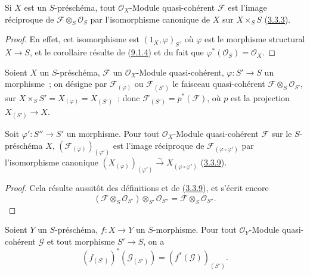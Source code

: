 \begin{corollary}[9.1.7]
\label{I.9.1.7-fr}
Si $X$ est un $S$-préschéma, tout $\mathscr{O}_X$-Module quasi-cohérent
$\mathscr{F}$ est l'image réciproque de
$\mathscr{F}\otimes_S\mathscr{O}_S$ par l'isomorphisme canonique de $X$ sur
$X\times_S S$ \textup{(\hyperref[I.3.3.3-fr]{3.3.3})}.
\end{corollary}

\begin{proof}
En effet, cet isomorphisme est $(1_X,\varphi)_S$, où $\varphi$ est le
morphisme structural $X\to S$, et le corollaire résulte de
(\hyperref[I.9.1.4-fr]{9.1.4}) et du fait que
$\varphi^*(\mathscr{O}_S)=\mathscr{O}_X$.
\end{proof}

\begin{env}[9.1.8]
\label{I.9.1.8-fr}
Soient $X$ un $S$-préschéma, $\mathscr{F}$ un $\mathscr{O}_X$-Module
quasi-cohérent, $\varphi:S'\to S$ un morphisme~; on désigne par
$\mathscr{F}_{(\varphi)}$ ou $\mathscr{F}_{(S')}$ le faisceau
quasi-cohérent $\mathscr{F}\otimes_S\mathscr{O}_{S'}$, sur
$X\times_S S'=X_{(\varphi)}=X_{(S')}$~; donc
$\mathscr{F}_{(S')}=p^*(\mathscr{F})$, où $p$ est la projection
$X_{(S')}\to X$.
\end{env}

\begin{proposition}[9.1.9]
\label{I.9.1.9-fr}
Soit $\varphi':S''\to S'$ un morphisme. Pour tout
$\mathscr{O}_X$-Module quasi-cohérent $\mathscr{F}$ sur le $S$-préschéma
$X$, $(\mathscr{F}_{(\varphi)})_{(\varphi')}$ est l'image réciproque de
$\mathscr{F}_{(\varphi\circ\varphi')}$ par l'isomorphisme canonique
$(X_{(\varphi)})_{(\varphi')}\xrightarrow{\sim}
X_{(\varphi\circ\varphi')}$ \textup{(\hyperref[I.3.3.9-fr]{3.3.9})}.
\end{proposition}

\begin{proof}
Cela résulte aussitôt des définitions et de
(\hyperref[I.3.3.9-fr]{3.3.9}), et s'écrit encore
\[
  (\mathscr{F}\otimes_S\mathscr{O}_{S'})
  \otimes_{S'}\mathscr{O}_{S''}
  =\mathscr{F}\otimes_S\mathscr{O}_{S''}.
  \tag{9.1.9.1}\label{I.9.1.9.1-fr}
\]
\end{proof}

\begin{proposition}[9.1.10]
\label{I.9.1.10-fr}
Soient $Y$ un $S$-préschéma, $f:X\to Y$ un $S$-morphisme. Pour tout
$\mathscr{O}_Y$-Module quasi-cohérent $\mathscr{G}$ et tout morphisme
$S'\to S$, on a
\[
  (f_{(S')})^*(\mathscr{G}_{(S')})
  =(f^*(\mathscr{G}))_{(S')}.
\]
\end{proposition}

